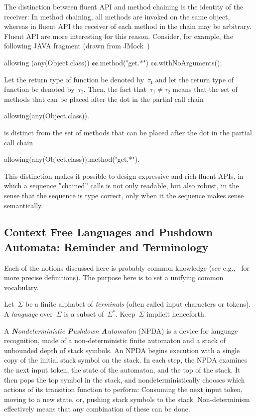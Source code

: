 The distinction between fluent API and method chaining is the identity of the receiver:
In method chaining, all methods are invoked on the same object, whereas in fluent API
  the receiver of each method in the chain may be arbitrary.
Fluent API are more interesting for this reason.
Consider, for example, the following JAVA fragment (drawn from JMock~\cite{Freeman:Pryce:06})
\begin{JAVA}
allowing (any(Object.class))
  ¢¢.method("get.*")
  ¢¢.withNoArguments();
\end{JAVA}
Let the return type of function  be denoted by~$τ₁$ and let the
  return type of function  be denoted by~$τ₂$.
Then, the fact that~$τ₁≠τ₂$ means that the set of methods that can be placed after the dot
  in the partial call chain
\begin{JAVA}
allowing(any(Object.class)).
\end{JAVA}
is distinct from the set of methods that can be placed after the dot in the partial call chain
\begin{JAVA}
allowing(any(Object.class)).method("get.*").
\end{JAVA}
This distinction makes it possible to design expressive and rich fluent APIs, in which a
  sequence ‟chained” calls is not only readable, but also robust, in the sense that the
  sequence is type correct, only when it the sequence makes sense semantically.

\subsection{Context Free Languages and Pushdown Automata: Reminder and Terminology}
Each of the notions discussed here is probably common knowledge
 (see e.g.,~\cite{Hopcroft:book:2001,Linz:2001} for more precise definitions).
The purpose here is to set a unifying common vocabulary.

Let~$Σ$ be a finite alphabet of \emph{terminals} (often called input characters or tokens).
A \emph{language} over~$Σ$
  is a subset of~$Σ^*$.
Keep~$Σ$ implicit henceforth.

A \emph{\textbf Nondeterministic \textbf Pushdown \textbf Automaton} (NPDA) is a device for language recognition,
  made of a non-deterministic finite automaton
  and a stack of unbounded depth of stack symbols.
An NPDA begins execution with a single copy of the initial stack symbol on the stack.
In each step, the NPDA
  examines the next input token,
  the state of the automaton,
  and the top of the stack.
It then pops the top symbol in the stack, and nondeterministically chooses which actions of
  its transition function to perform:
  Consuming the next input token,
  moving to a new state,
  or, pushing stack symbols to the stack.
Non-determinism effectively means
  that any combination of these can be done.

